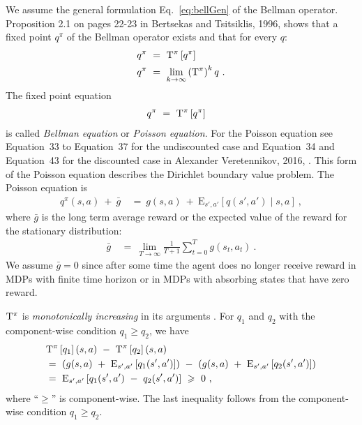 \documentclass{article}
\newcommand\EXP{\mathbf{\mathrm{E}}}
\renewcommand{\geq}{\geqslant}
\begin{document}
\begin{appendices}
We assume the general formulation Eq.~\eqref{eq:bellGen} of the
Bellman operator.
Proposition 2.1 on pages 22-23 in
Bertsekas and Tsitsiklis, 1996, \cite{Bertsekas:96} shows that
a fixed point $q^\pi$ of the Bellman operator exists and that for every
$q$:
\begin{align}
  q^\pi \ &= \ \mathrm{T}^\pi \left[ q^\pi\right] \\
  q^\pi \ &= \ \lim_{k\to \infty} \left(\mathrm{T}^\pi\right)^k q  \ .
\end{align} 
The fixed point equation 
\begin{align}
  q^\pi \ &= \ \mathrm{T}^\pi \left[ q^\pi\right] 
\end{align}
is called {\em Bellman equation} or {\em Poisson equation}.
For the Poisson equation see
Equation~33 to Equation~37 for the undiscounted case and Equation~34 and Equation~43 for the
discounted case in Alexander Veretennikov, 2016,
\cite{Veretennikov:16}.
This form of the Poisson equation describes the Dirichlet boundary
value problem. The Poisson equation is
\begin{align}
\label{eq:poisson}
 q^\pi(s,a) \ + \ \bar{g} \ &= \  g(s,a)
 \ + \ \EXP_{s',a'} \left[q(s',a') \mid s,a  \right] \ ,
\end{align} 
where $\bar{g}$ is the long term average reward or the expected 
value of the reward for the stationary distribution:
\begin{align}
 \bar{g} \ &= \  \lim_{T\to \infty} \frac{1}{T+1} \sum_{t=0}^T g(s_t,a_t) \ .
\end{align} 
We assume $\bar{g}=0$ since after some time the agent does no longer
receive reward in MDPs with finite time horizon or in MDPs with
absorbing states that have zero reward.


$\mathrm{T}^\pi$ is {\em monotonically increasing} in its arguments \cite{Bertsekas:96}.
For $q_1$ and $q_2$ with the component-wise condition $q_1 \geq q_2$, we have
\begin{align}
  &\rT^\pi \left[ q_1\right](s,a)  \ - \  \rT^\pi \left[ q_2\right](s,a)  \\ \nonumber
  &= \ \left( g(s,a)
 \ + \ \EXP_{s',a'} \left[q_1(s',a')  \right] \right)  \ - \ \left( g(s,a)
 \ + \ \EXP_{s',a'} \left[q_2(s',a')  \right] \right)\\ \nonumber
 &= \ \EXP_{s',a'} \left[q_1(s',a') \ - \ q_2(s',a') \right]
  \ \geq \ 0 \ ,
\end{align}
where ``$\geq$'' is component-wise. The last inequality follows from
the component-wise condition $q_1 \geq q_2$.


\end{appendices}
\end{document}
